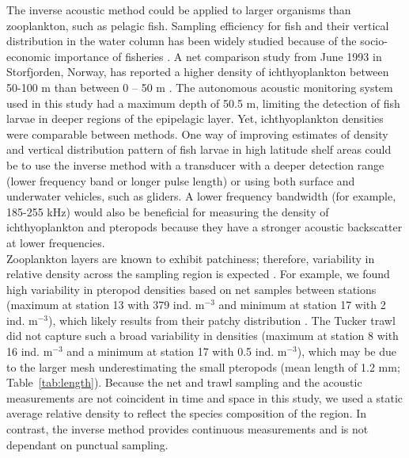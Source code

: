 The inverse acoustic method could be applied to larger organisms than zooplankton, such as pelagic fish. Sampling efficiency for fish and their vertical distribution in the water column has been widely studied because of the socio-economic importance of fisheries \citep{Handegard2005}. A net comparison study from June 1993 in Storfjorden, Norway, has reported a higher density of ichthyoplankton between 50-100 m than between 0 – 50 m \citep{Skjoldal2013}. The autonomous acoustic monitoring system used in this study had a maximum depth of 50.5 m, limiting the detection of fish larvae in deeper regions of the epipelagic layer. Yet, ichthyoplankton densities were comparable between methods. One way of improving estimates of density and vertical distribution pattern of fish larvae in high latitude shelf areas could be to use the inverse method with a transducer with a deeper detection range (lower frequency band or longer pulse length) or using both surface and underwater vehicles, such as gliders. A lower frequency bandwidth (for example, 185-255 kHz) would also be beneficial for measuring the density of ichthyoplankton and pteropods because they have a stronger acoustic backscatter at lower frequencies. \\
Zooplankton layers are known to exhibit patchiness; therefore, variability in relative density across the sampling region is expected \citep{Trevorrow2005, Basedow2006, Trudnowska2016}. For example, we found high variability in pteropod densities based on net samples between stations (maximum at station 13 with 379 ind. m$^{-3}$ and minimum at station 17 with 2 ind. m$^{-3}$), which likely results from their patchy distribution \citep{Elizondo2022}. The Tucker trawl did not capture such a broad variability in densities (maximum at station 8 with 16 ind. m$^{-3}$ and a minimum at station 17 with 0.5 ind. m$^{-3}$), which may be due to the larger mesh underestimating the small pteropods (mean length of 1.2 mm; Table~\ref{tab:length}). Because the net and trawl sampling and the acoustic measurements are not coincident in time and space in this study, we used a static average relative density to reflect the species composition of the region. In contrast, the inverse method provides continuous measurements and is not dependant on punctual sampling.

